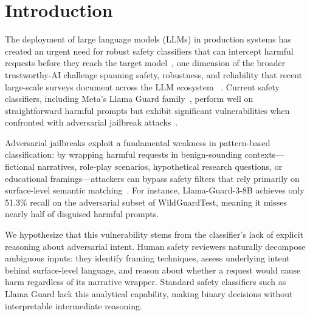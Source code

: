 \documentclass[superintelligence,article,accept,moreauthors]{Definitions/mdpi}
\renewcommand{\hl}[1]{#1}
\begin{document}

\section{Introduction}

The deployment of large language models (LLMs) in production systems has created an urgent need for robust safety classifiers that can intercept harmful requests before they reach the target model~\citep{inan2023llamaguard, han2024wildguard}, one dimension of the broader trustworthy-AI challenge spanning safety, robustness, and reliability that recent large-scale surveys document across the LLM \hl{ecosystem}%
~\citep{sun2024trustllm}. Current safety classifiers, including Meta's Llama Guard \mbox{family~\citep{inan2023llamaguard, metallamaguard3},} perform well on straightforward harmful prompts but exhibit significant vulnerabilities when confronted with adversarial jailbreak attacks~\citep{chao2023jailbreaking, zou2023universal, liu2024autodan}.

Adversarial jailbreaks exploit a fundamental weakness in pattern-based classification: by wrapping harmful requests in benign-sounding contexts---fictional narratives, role-play scenarios, hypothetical research questions, or educational framings---attackers can bypass safety filters that rely primarily on surface-level semantic matching~\citep{wei2024jailbroken}. For instance, Llama-Guard-3-8B achieves only 51.3\% recall on the adversarial subset of WildGuardTest, meaning it misses nearly half of disguised harmful prompts.

We hypothesize that this vulnerability stems from the classifier's lack of explicit reasoning about adversarial intent. Human safety reviewers naturally decompose ambiguous inputs: they identify framing techniques, assess underlying intent behind surface-level language, and reason about whether a request would cause harm regardless of its narrative wrapper. Standard safety classifiers such as Llama Guard lack this analytical capability, making binary decisions without interpretable intermediate reasoning.
\end{document}
